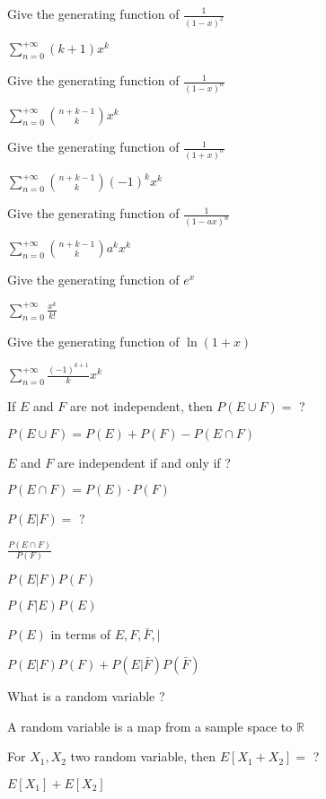 \documentclass[12pt]{article}
\newcommand*{\xfield}[1]{\begin{mdframed}\centering #1\end{mdframed}\bigskip}
\newenvironment{note}{}{}
\begin{document}
\begin{note}
	\xfield{Give the generating function of $\frac{1}{(1-x)^2}$}
	\xfield{$\sum\limits_{n=0}^{+{\infty}}{(k+1)x^k}$}
\end{note}

\begin{note}
	\xfield{Give the generating function of $\frac{1}{(1-x)^n}$}
	\xfield{$\sum\limits_{n=0}^{+{\infty}}{\binom{n+k-1}{k}x^k}$}
\end{note}

\begin{note}
	\xfield{Give the generating function of $\frac{1}{(1+x)^n}$}
	\xfield{$\sum\limits_{n=0}^{+{\infty}}{\binom{n+k-1}{k}(-1)^k x^k}$}
\end{note}

\begin{note}
	\xfield{Give the generating function of $\frac{1}{(1-ax)^n}$}
	\xfield{$\sum\limits_{n=0}^{+{\infty}}{\binom{n+k-1}{k}a^k x^k}$}
\end{note}

\begin{note}
	\xfield{Give the generating function of $e^x$}
	\xfield{$\sum\limits_{n=0}^{+{\infty}}{\frac{x^k}{k!}}$}
\end{note}

\begin{note}
	\xfield{Give the generating function of $\ln(1+x)$}
	\xfield{$\sum\limits_{n=0}^{+{\infty}}{\frac{(-1)^{k+1}}{k}x^k}$}
\end{note}

\begin{note}
	\xfield{If $E$ and $F$ are not independent, then $P(E\cup F) = $ ?}
	\xfield{$P(E\cup F) = P(E) + P(F) - P(E\cap F)$}
\end{note}

\begin{note}
	\xfield{$E$ and $F$ are independent if and only if ?}
	\xfield{$P(E\cap F) = P(E) \cdot P(F)$}
\end{note}

\begin{note}
	\xfield{$P(E\vert F) = $ ?}
	\xfield{$\frac{P(E\cap F)}{P(F)}$}
\end{note}

\begin{note}
	\xfield{$P(E\vert F)P(F)$}
	\xfield{$P(F\vert E)P(E)$}
\end{note}

\begin{note}
	\xfield{$P(E)$ in terms of $E,F,\bar{F},\vert$}
	\xfield{$P(E\vert F)P(F)+P(E\vert \bar{F})P(\bar{F})$}
\end{note}

\begin{note}
	\xfield{What is a random variable ?}
	\xfield{A random variable is a map from a sample space to $\mathbb{R}$}
\end{note}

\begin{note}
	\xfield{For $X_1,X_2$ two random variable, then $E[X_1 + X_2] = $ ?}
	\xfield{$E[X_1]+E[X_2]$}
\end{note}
\end{document}

